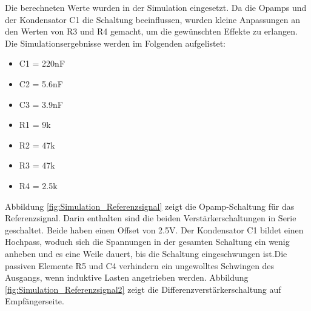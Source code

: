Die berechneten Werte wurden in der Simulation eingesetzt. Da die Opamps und der Kondensator C1 die Schaltung beeinflussen, wurden kleine Anpassungen an den Werten von R3 und R4 gemacht, um die gewünschten Effekte zu erlangen. Die Simulationsergebnisse werden im Folgenden aufgelistet:
\begin{itemize}
\item C1 = 220nF
\item C2 = 5.6nF
\item C3 = 3.9nF
\item R1 = 9k\textOmega
\item R2 = 47k\textOmega
\item R3 = 47k\textOmega
\item R4 = 2.5k\textOmega
\end{itemize}

%
%
%
%
%




Abbildung \ref{fig:Simulation_Referenzsignal} zeigt die Opamp-Schaltung für das Referenzsignal. Darin enthalten sind die beiden Verstärkerschaltungen in Serie geschaltet. Beide haben einen Offset von 2.5V. Der Kondensator C1 bildet einen Hochpass, woduch sich die Spannungen in der gesamten Schaltung ein wenig anheben und es eine Weile dauert, bis die Schaltung eingeschwungen ist.Die passiven Elemente R5 und C4 verhindern ein ungewolltes Schwingen des Ausgangs, wenn induktive Lasten angetrieben werden.
Abbildung \ref{fig:Simulation_Referenzsignal2} zeigt die Differenzverstärkerschaltung auf Empfängerseite.


